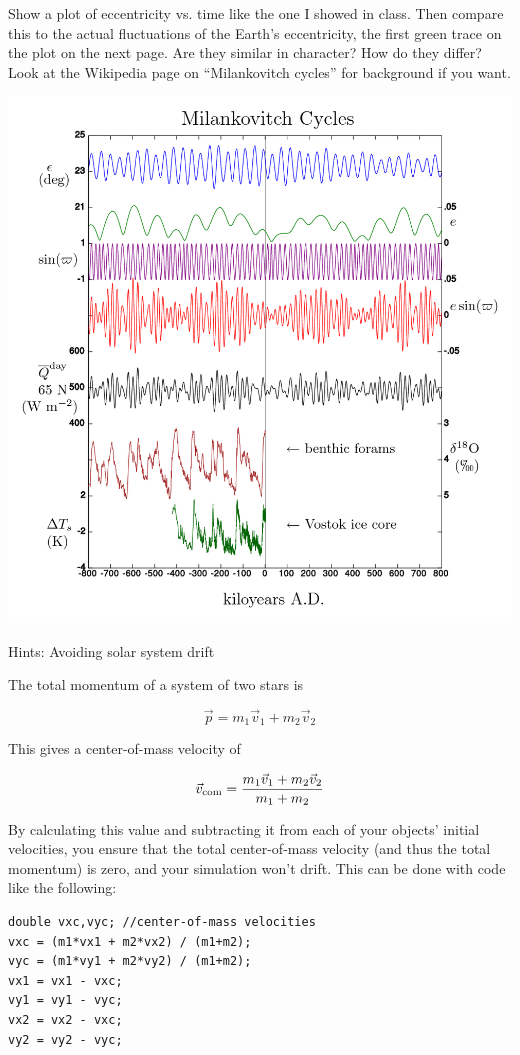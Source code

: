 \documentclass[12pt]{article}
\begin{document}
Show a plot of eccentricity vs. time like the one I showed in class. Then compare this to the actual fluctuations of the Earth's eccentricity, the first green trace on the plot on the next page. Are they similar in character? How do they differ? Look at the 
Wikipedia page on ``Milankovitch cycles'' for background if you want.

\bigskip
\begin{center}
\includegraphics[width=6in]{milankovitch.png}
\end{center}

\newpage

\bigskip
\bigskip

\begin{center}
\Large Hints: Avoiding solar system drift
\end{center}

\normalsize

The total momentum of a system of two stars is

$$
\vec p =m_1 \vec v_1 + m_2 \vec v_2
$$

This gives a center-of-mass velocity of 

$$\vec v_{\rm com} = \frac{m_1 \vec v_1 + m_2 \vec v_2}{m_1+m_2}$$

By calculating this value and subtracting it from each of your objects' initial velocities,
you ensure that the total center-of-mass velocity (and thus the total momentum) is zero,
and your simulation won't drift. This can be done with code like the following:

\begin{verbatim}
double vxc,vyc; //center-of-mass velocities
vxc = (m1*vx1 + m2*vx2) / (m1+m2); 
vyc = (m1*vy1 + m2*vy2) / (m1+m2); 
vx1 = vx1 - vxc;
vy1 = vy1 - vyc;
vx2 = vx2 - vxc;
vy2 = vy2 - vyc;
\end{verbatim}
\end{document}
